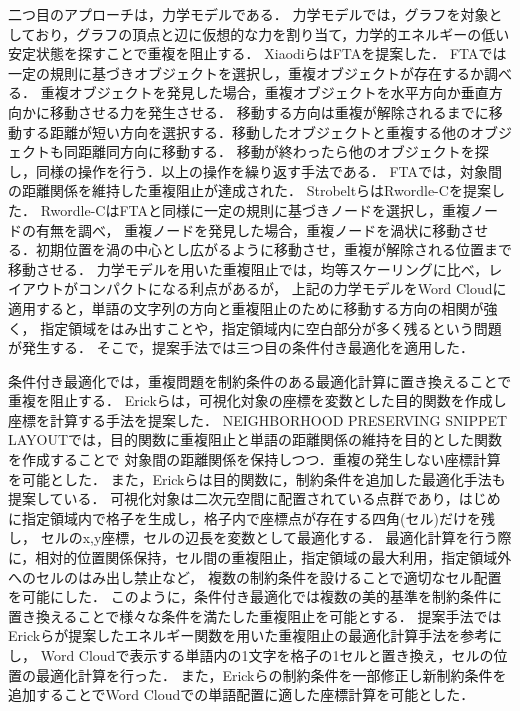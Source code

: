 \documentclass[syuuron]{kuee}
\begin{document}
		二つ目のアプローチは，力学モデルである．
		力学モデルでは，グラフを対象としており，グラフの頂点と辺に仮想的な力を割り当て，力学的エネルギーの低い安定状態を探すことで重複を阻止する．
		XiaodiらはFTAを提案した\cite{fta1}．
		FTAでは一定の規則に基づきオブジェクトを選択し，重複オブジェクトが存在するか調べる．
		重複オブジェクトを発見した場合，重複オブジェクトを水平方向か垂直方向かに移動させる力を発生させる．
		移動する方向は重複が解除されるまでに移動する距離が短い方向を選択する．移動したオブジェクトと重複する他のオブジェクトも同距離同方向に移動する．
		移動が終わったら他のオブジェクトを探し，同様の操作を行う．以上の操作を繰り返す手法である．
		FTAでは，対象間の距離関係を維持した重複阻止が達成された．
		StrobeltらはRwordle-Cを提案した\cite{rwc1}．
		Rwordle-CはFTAと同様に一定の規則に基づきノードを選択し，重複ノードの有無を調べ，
		重複ノードを発見した場合，重複ノードを渦状に移動させる．初期位置を渦の中心とし広がるように移動させ，重複が解除される位置まで移動させる．
		力学モデルを用いた重複阻止では，均等スケーリングに比べ，レイアウトがコンパクトになる利点があるが，
		上記の力学モデルをWord Cloudに適用すると，単語の文字列の方向と重複阻止のために移動する方向の相関が強く，
		指定領域をはみ出すことや，指定領域内に空白部分が多く残るという問題が発生する．
		そこで，提案手法では三つ目の条件付き最適化を適用した．
		
		条件付き最適化では，重複問題を制約条件のある最適化計算に置き換えることで重複を阻止する．
		Erickらは，可視化対象の座標を変数とした目的関数を作成し座標を計算する手法を提案した\cite{or1}．
		NEIGHBORHOOD PRESERVING SNIPPET LAYOUTでは，目的関数に重複阻止と単語の距離関係の維持を目的とした関数を作成することで
		対象間の距離関係を保持しつつ．重複の発生しない座標計算を可能とした．
		また，Erickらは目的関数に，制約条件を追加した最適化手法も提案している\cite{or2}． 
		可視化対象は二次元空間に配置されている点群であり，はじめに指定領域内で格子を生成し，格子内で座標点が存在する四角(セル)だけを残し，
		セルのx,y座標，セルの辺長を変数として最適化する．
		最適化計算を行う際に，相対的位置関係保持，セル間の重複阻止，指定領域の最大利用，指定領域外へのセルのはみ出し禁止など，
		複数の制約条件を設けることで適切なセル配置を可能にした．
		このように，条件付き最適化では複数の美的基準を制約条件に置き換えることで様々な条件を満たした重複阻止を可能とする．
		提案手法ではErickらが提案したエネルギー関数を用いた重複阻止の最適化計算手法を参考にし，
		Word Cloudで表示する単語内の1文字を格子の1セルと置き換え，セルの位置の最適化計算を行った．
		また，Erickらの制約条件を一部修正し新制約条件を追加することでWord Cloudでの単語配置に適した座標計算を可能とした．
		
\end{document}
